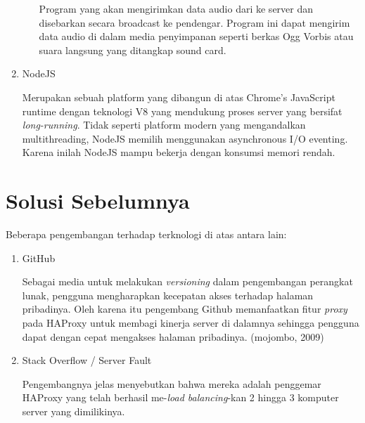 \begin{enumerate}
\begin{enumerate}
        Program yang akan mengirimkan data audio dari ke server dan disebarkan secara broadcast ke pendengar. Program ini dapat mengirim data audio di dalam media penyimpanan seperti berkas Ogg Vorbis atau suara langsung yang ditangkap sound card.
    \end{enumerate}
    
    \item NodeJS
    
    Merupakan sebuah platform yang dibangun di atas Chrome's JavaScript runtime dengan teknologi V8 yang mendukung proses server yang bersifat \textit{long-running}. Tidak seperti platform modern yang mengandalkan multithreading, NodeJS memilih menggunakan asynchronous I/O eventing. Karena inilah NodeJS mampu bekerja dengan konsumsi memori rendah.
    
    
    
\end{enumerate}

\section{Solusi Sebelumnya}

Beberapa pengembangan terhadap terknologi di atas antara lain:

\begin{enumerate}
    \item GitHub
    
    Sebagai media untuk melakukan \textit{versioning} dalam pengembangan perangkat lunak, pengguna mengharapkan kecepatan akses terhadap halaman pribadinya. Oleh karena itu pengembang Github memanfaatkan fitur \textit{proxy} pada HAProxy untuk membagi kinerja server di dalamnya sehingga pengguna dapat dengan cepat mengakses halaman pribadinya. (mojombo, 2009)
    
    \item Stack Overflow / Server Fault
    
    Pengembangnya jelas menyebutkan bahwa mereka adalah penggemar HAProxy yang telah berhasil me-\textit{load balancing}-kan 2 hingga 3 komputer server yang dimilikinya.
\end{enumerate}
